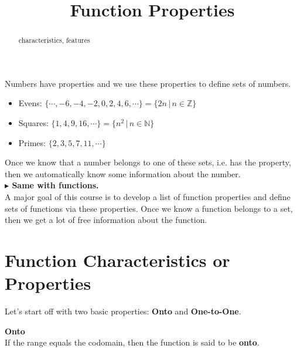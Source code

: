 \documentclass{ximera}
\title{Function Properties}
\begin{document}
\begin{abstract}
characteristics, features
\end{abstract}
\maketitle





Numbers have properties and we use these properties to define sets of numbers. \\



\begin{itemize}
\item Evens:  $\{ \cdots, -6, -4, -2, 0, 2, 4, 6, \cdots \} = \{ 2n   \, | \, n \in \mathbb{Z} \}$
\item Squares:  $\{ 1, 4, 9, 16, \cdots \} = \{ n^2   \, | \, n \in \mathbb{N} \}$
\item Primes:  $\{ 2, 3, 5, 7, 11,  \cdots \}$
\end{itemize}

Once we know that a number belongs to one of these sets, i.e. has the property, then we automatically know some information about the number. \\


\textbf{\textcolor{red!90!darkgray}{$\blacktriangleright$ Same with functions.}}  \\



A major goal of this course is to develop a list of function properties and define sets of functions via these properties.  Once we know a function belongs to a set, then we get a lot of free information about the function. \\









\section{Function Characteristics or Properties}


Let's start off with two basic properties: \textbf{Onto} and \textbf{One-to-One}.







\begin{definition} \textbf{\textcolor{green!50!black}{Onto}} \\

If the range equals the codomain, then the function is said to be \textbf{onto}.

\end{definition}
\end{document}
